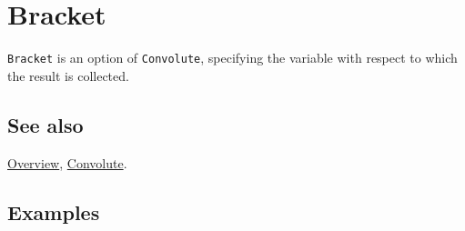 \documentclass[../FeynCalcManual.tex]{subfiles}
\begin{document}
\hypertarget{bracket}{
\section{Bracket}\label{bracket}}

\texttt{Bracket} is an option of \texttt{Convolute}, specifying the
variable with respect to which the result is collected.

\subsection{See also}

\hyperlink{toc}{Overview}, \hyperlink{convolute}{Convolute}.

\subsection{Examples}
\end{document}
